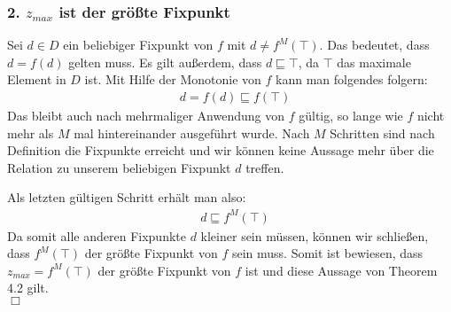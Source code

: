 \subsubsection*{2. $z_{max}$ ist der größte Fixpunkt}
Sei $d \in D$ ein beliebiger Fixpunkt von $f$ mit $ d \ne f^M(\top)$.
Das bedeutet, dass $ d = f(d)$ gelten muss.
Es gilt außerdem, dass $d \sqsubseteq \top$, da $\top$ das maximale Element in $D$ ist.
Mit Hilfe der Monotonie von $f$ kann man folgendes folgern:
\begin{align*}
& d = f(d) \sqsubseteq f(\top)
\end{align*}
Das bleibt auch nach mehrmaliger Anwendung von $f$ gültig,
 so lange wie $f$ nicht mehr als $M$ mal hintereinander ausgeführt wurde.
Nach $M$ Schritten sind nach Definition die Fixpunkte erreicht und wir können keine
Aussage mehr über die Relation zu unserem beliebigen Fixpunkt $d$ treffen.

Als letzten gültigen Schritt erhält man also:
\begin{align*}
& d \sqsubseteq f^M(\top)
\end{align*}
Da somit alle anderen Fixpunkte $d$ kleiner sein müssen, können wir schließen,
dass $f^M(\top)$ der größte Fixpunkt von $f$ sein muss.
Somit ist bewiesen, dass $z_{max} = f^M(\top)$ der größte Fixpunkt von $f$ ist
 und diese Aussage von Theorem 4.2 gilt.\\
$\Box$
